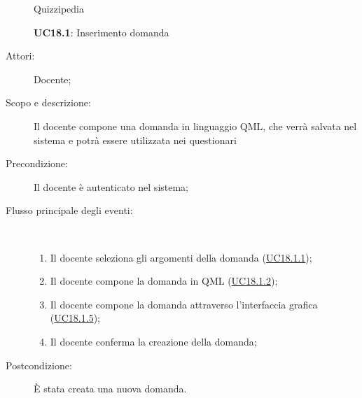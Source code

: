 	\begin{figure}[H]
		\centering
		\begin{resizedtikzpicture}{\textwidth}
		\begin{umlsystem}[x=0, fill=lightgray!20]{Quizzipedia}
		\end{umlsystem}
		\end{resizedtikzpicture}
		\caption{\textbf{UC18.1}: Inserimento domanda}
		\label{UC18.1}
	\end{figure}
\begin{description}
\item[Attori:] Docente;
\item[Scopo e descrizione:] Il docente compone una domanda in linguaggio QML, che verrà salvata nel sistema e potrà essere utilizzata nei questionari
      \item[Precondizione:] Il docente è autenticato nel sistema;

        \item[Flusso principale degli eventi:] \ 
 \begin{enumerate}
          \item Il docente seleziona gli argomenti della domanda (\hyperlink{UC18.1.1}{UC18.1.1});
          \item Il docente compone la domanda in QML  (\hyperlink{UC18.1.2}{UC18.1.2});
          \item Il docente compone la domanda attraverso l'interfaccia grafica (\hyperlink{UC18.1.5}{UC18.1.5});
          \item Il docente conferma la creazione della domanda;

      \end{enumerate}
    \item[Postcondizione:] È stata creata una nuova domanda.
  \end{description}
\hypertarget{UC18.1.1}{}
